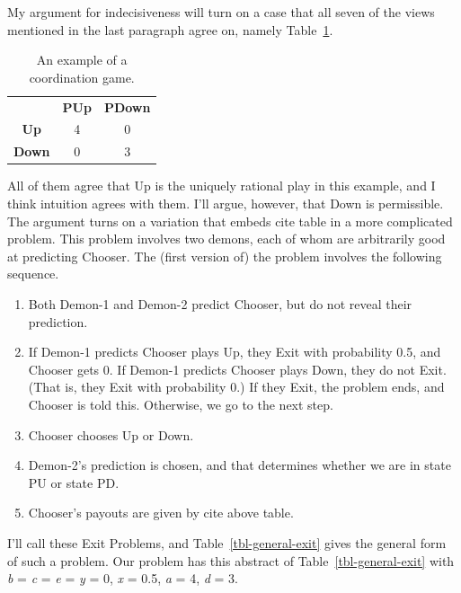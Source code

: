 \documentclass[
  12pt,
  letterpaper,
  DIV=11,
  numbers=noendperiod]{scrreprt}
\providecommand{\tightlist}{%
  \setlength{\itemsep}{0pt}\setlength{\parskip}{0pt}}\usepackage{longtable,booktabs,array}
\begin{document}
My argument for indecisiveness will turn on a case that all seven of the
views mentioned in the last paragraph agree on, namely
Table~\ref{tbl-coord}.

\begin{longtable}[]{@{}ccc@{}}
\caption{An example of a coordination
game.}\label{tbl-coord}\tabularnewline
\toprule\noalign{}
\endfirsthead
\endhead
\bottomrule\noalign{}
\endlastfoot
& \textbf{PUp} & \textbf{PDown} \\
\textbf{Up} & 4 & 0 \\
\textbf{Down} & 0 & 3 \\
\end{longtable}

All of them agree that Up is the uniquely rational play in this example,
and I think intuition agrees with them. I'll argue, however, that Down
is permissible. The argument turns on a variation that embeds cite table
in a more complicated problem. This problem involves two demons, each of
whom are arbitrarily good at predicting Chooser. The (first version of)
the problem involves the following sequence.

\begin{enumerate}
\def\labelenumi{\arabic{enumi}.}
\tightlist
\item
  Both Demon-1 and Demon-2 predict Chooser, but do not reveal their
  prediction.
\item
  If Demon-1 predicts Chooser plays Up, they Exit with probability 0.5,
  and Chooser gets 0. If Demon-1 predicts Chooser plays Down, they do
  not Exit. (That is, they Exit with probability 0.) If they Exit, the
  problem ends, and Chooser is told this. Otherwise, we go to the next
  step.
\item
  Chooser chooses Up or Down.
\item
  Demon-2's prediction is chosen, and that determines whether we are in
  state PU or state PD.
\item
  Chooser's payouts are given by cite above table.
\end{enumerate}

I'll call these Exit Problems, and Table~\ref{tbl-general-exit} gives
the general form of such a problem. Our problem has this abstract of
Table~\ref{tbl-general-exit} with \emph{b} = \emph{c} = \emph{e} =
\emph{y} = 0, \emph{x} = 0.5, \emph{a} = 4, \emph{d} = 3.
\end{document}
